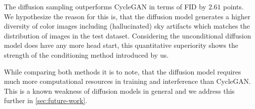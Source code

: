The diffusion sampling outperforms CycleGAN in terms of FID by $2.61$ points.
We hypothesize the reason for this is, that the diffusion model generates a higher diversity of color images including (hallucinated) sky artifacts which matches the distribution of images in the test dataset.
Considering the unconditional diffusion model does have any more head start, this quantitative superiority shows the strength of the conditioning method introduced by us.

While comparing both methods it is to note, that the diffusion model requires much more computational resources in training and interference than CycleGAN.
This is a known weakness of diffusion models in general and we address this further in \autoref{sec:future-work}.